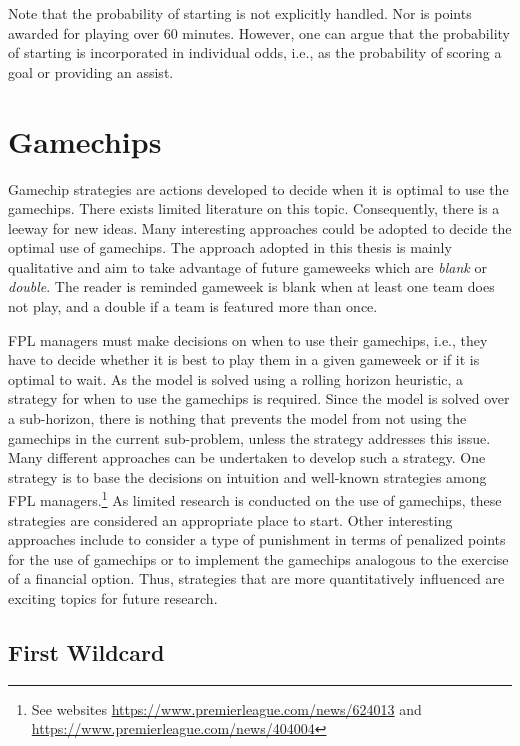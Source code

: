 Note that the probability of starting is not explicitly handled. Nor is points awarded for playing over 60 minutes. However, one can argue that the probability of starting is incorporated in individual odds, i.e., as the probability of scoring a goal or providing an assist.

\section{Gamechips} \label{Ch.5_Game_chips}

Gamechip strategies are actions developed to decide when it is optimal to use the gamechips. There exists limited literature on this topic. Consequently, there is a leeway for new ideas. Many interesting approaches could be adopted to decide the optimal use of gamechips. The approach adopted in this thesis is mainly qualitative and aim to take advantage of future gameweeks which are \textit{blank} or \textit{double}. The reader is reminded gameweek is blank when at least one team does not play, and a double if a team is featured more than once. 

\newpar

FPL managers must make decisions on when to use their gamechips, i.e., they have to decide whether it is best to play them in a given gameweek or if it is optimal to wait. As the model is solved using a rolling horizon heuristic, a strategy for when to use the gamechips is required. Since the model is solved over a sub-horizon, there is nothing that prevents the model from not using the gamechips in the current sub-problem, unless the strategy addresses this issue. Many different approaches can be undertaken to develop such a strategy. One strategy is to base the decisions on intuition and well-known strategies among FPL managers.\footnote{See websites \url{https://www.premierleague.com/news/624013} and \url{https://www.premierleague.com/news/404004}} As limited research is conducted on the use of gamechips, these strategies are considered an appropriate place to start. Other interesting approaches include to consider a type of punishment in terms of penalized points for the use of gamechips or to implement the gamechips analogous to the exercise of a financial option. Thus, strategies that are more quantitatively influenced are exciting topics for future research.

\subsection{First Wildcard}

